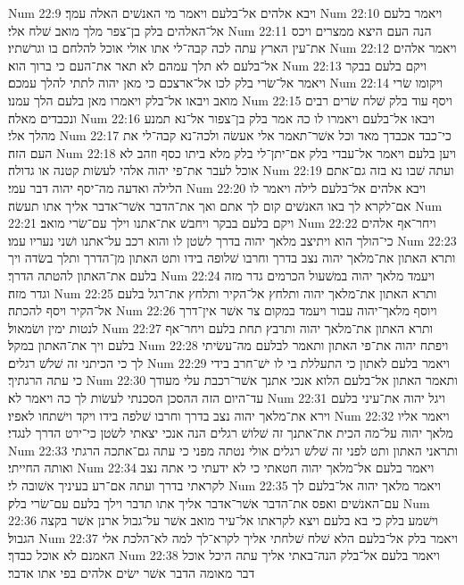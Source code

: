 Num 22:9  ויבא אלהים אל־בלעם ויאמר מי האנשׁים האלה עמך׃
Num 22:10  ויאמר בלעם אל־האלהים בלק בן־צפר מלך מואב שׁלח אלי׃
Num 22:11  הנה העם היצא ממצרים ויכס את־עין הארץ עתה לכה קבה־לי אתו אולי אוכל להלחם בו וגרשׁתיו׃
Num 22:12  ויאמר אלהים אל־בלעם לא תלך עמהם לא תאר את־העם כי ברוך הוא׃
Num 22:13  ויקם בלעם בבקר ויאמר אל־שׂרי בלק לכו אל־ארצכם כי מאן יהוה לתתי להלך עמכם׃
Num 22:14  ויקומו שׂרי מואב ויבאו אל־בלק ויאמרו מאן בלעם הלך עמנו׃
Num 22:15  ויסף עוד בלק שׁלח שׂרים רבים ונכבדים מאלה׃
Num 22:16  ויבאו אל־בלעם ויאמרו לו כה אמר בלק בן־צפור אל־נא תמנע מהלך אלי׃
Num 22:17  כי־כבד אכבדך מאד וכל אשׁר־תאמר אלי אעשׂה ולכה־נא קבה־לי את העם הזה׃
Num 22:18  ויען בלעם ויאמר אל־עבדי בלק אם־יתן־לי בלק מלא ביתו כסף וזהב לא אוכל לעבר את־פי יהוה אלהי לעשׂות קטנה או גדולה׃
Num 22:19  ועתה שׁבו נא בזה גם־אתם הלילה ואדעה מה־יסף יהוה דבר עמי׃
Num 22:20  ויבא אלהים אל־בלעם לילה ויאמר לו אם־לקרא לך באו האנשׁים קום לך אתם ואך את־הדבר אשׁר־אדבר אליך אתו תעשׂה׃
Num 22:21  ויקם בלעם בבקר ויחבשׁ את־אתנו וילך עם־שׂרי מואב׃
Num 22:22  ויחר־אף אלהים כי־הולך הוא ויתיצב מלאך יהוה בדרך לשׂטן לו והוא רכב על־אתנו ושׁני נעריו עמו׃
Num 22:23  ותרא האתון את־מלאך יהוה נצב בדרך וחרבו שׁלופה בידו ותט האתון מן־הדרך ותלך בשׂדה ויך בלעם את־האתון להטתה הדרך׃
Num 22:24  ויעמד מלאך יהוה במשׁעול הכרמים גדר מזה וגדר מזה׃
Num 22:25  ותרא האתון את־מלאך יהוה ותלחץ אל־הקיר ותלחץ את־רגל בלעם אל־הקיר ויסף להכתה׃
Num 22:26  ויוסף מלאך־יהוה עבור ויעמד במקום צר אשׁר אין־דרך לנטות ימין ושׂמאול׃
Num 22:27  ותרא האתון את־מלאך יהוה ותרבץ תחת בלעם ויחר־אף בלעם ויך את־האתון במקל׃
Num 22:28  ויפתח יהוה את־פי האתון ותאמר לבלעם מה־עשׂיתי לך כי הכיתני זה שׁלשׁ רגלים׃
Num 22:29  ויאמר בלעם לאתון כי התעללת בי לו ישׁ־חרב בידי כי עתה הרגתיך׃
Num 22:30  ותאמר האתון אל־בלעם הלוא אנכי אתנך אשׁר־רכבת עלי מעודך עד־היום הזה ההסכן הסכנתי לעשׂות לך כה ויאמר לא׃
Num 22:31  ויגל יהוה את־עיני בלעם וירא את־מלאך יהוה נצב בדרך וחרבו שׁלפה בידו ויקד וישׁתחו לאפיו׃
Num 22:32  ויאמר אליו מלאך יהוה על־מה הכית את־אתנך זה שׁלושׁ רגלים הנה אנכי יצאתי לשׂטן כי־ירט הדרך לנגדי׃
Num 22:33  ותראני האתון ותט לפני זה שׁלשׁ רגלים אולי נטתה מפני כי עתה גם־אתכה הרגתי ואותה החייתי׃
Num 22:34  ויאמר בלעם אל־מלאך יהוה חטאתי כי לא ידעתי כי אתה נצב לקראתי בדרך ועתה אם־רע בעיניך אשׁובה לי׃
Num 22:35  ויאמר מלאך יהוה אל־בלעם לך עם־האנשׁים ואפס את־הדבר אשׁר־אדבר אליך אתו תדבר וילך בלעם עם־שׂרי בלק׃
Num 22:36  וישׁמע בלק כי בא בלעם ויצא לקראתו אל־עיר מואב אשׁר על־גבול ארנן אשׁר בקצה הגבול׃
Num 22:37  ויאמר בלק אל־בלעם הלא שׁלח שׁלחתי אליך לקרא־לך למה לא־הלכת אלי האמנם לא אוכל כבדך׃
Num 22:38  ויאמר בלעם אל־בלק הנה־באתי אליך עתה היכל אוכל דבר מאומה הדבר אשׁר ישׂים אלהים בפי אתו אדבר׃
